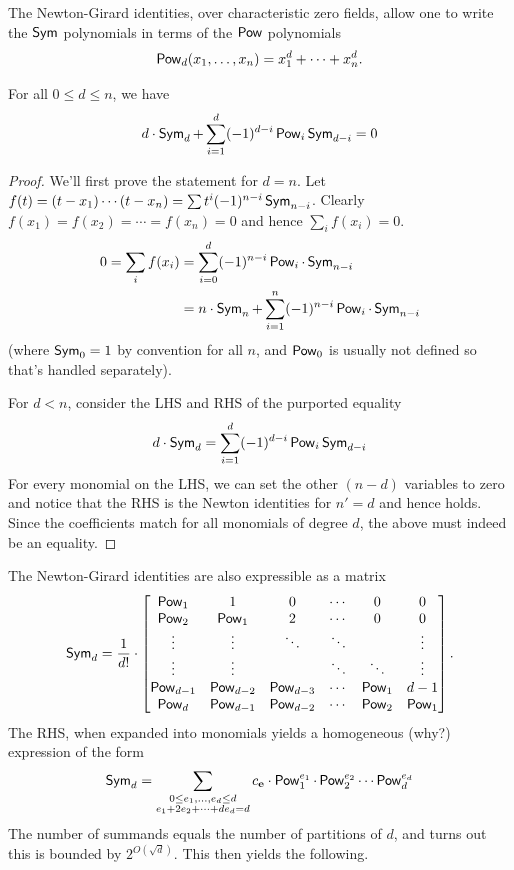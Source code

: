 The Newton-Girard identities, over characteristic zero fields, allow one to write the $\operatorname{\mathsf{Sym}}$ polynomials in terms of the $\operatorname{\mathsf{Pow}}$ polynomials
\[
\operatorname{\mathsf{Pow}}_d(x_1,\ldots, x_n) = x_1^d + \cdots + x_n^d.
\]
\begin{lemma}
For all $0 \leq d \leq n$, we have
\[
d \cdot \operatorname{\mathsf{Sym}}_d + \sum_{i=1}^d (-1)^{d-i}\operatorname{\mathsf{Pow}}_i \operatorname{\mathsf{Sym}}_{d-i} = 0
\]
\end{lemma}
\begin{proof}
  We'll first prove the statement for $d = n$. 
  Let $f(t) = (t - x_1) \cdots (t - x_n) = \sum t^i (-1)^{n-i} \operatorname{\mathsf{Sym}}_{n-i}$. Clearly $f(x_1) = f(x_2) = \cdots = f(x_n) = 0$ and hence $\sum_i f(x_i) = 0$. 
  \begin{align*}
  0 = \sum_i f(x_i) &= \sum_{i=0}^d (-1)^{n-i} \operatorname{\mathsf{Pow}}_i \cdot \operatorname{\mathsf{Sym}}_{n-i}\\
    & = n \cdot \operatorname{\mathsf{Sym}}_n + \sum_{i=1}^n (-1)^{n-i} \operatorname{\mathsf{Pow}}_i \cdot \operatorname{\mathsf{Sym}}_{n-i}
  \end{align*}
  (where $\operatorname{\mathsf{Sym}}_0 = 1$ by convention for all $n$, and $\operatorname{\mathsf{Pow}}_0$ is usually not defined so that's handled separately). 

  For $d < n$, consider the LHS and RHS of the purported equality
  \[
  d \cdot \operatorname{\mathsf{Sym}}_d = \sum_{i=1}^d (-1)^{d-i} \operatorname{\mathsf{Pow}}_i \operatorname{\mathsf{Sym}}_{d-i}
  \]
  For every monomial on the LHS, we can set the other $(n-d)$ variables to zero and notice that the RHS is the Newton identities for $n' = d$ and hence holds. Since the coefficients match for all monomials of degree $d$, the above must indeed be an equality.
\end{proof}

The Newton-Girard identities are also expressible as a matrix
\[
  \operatorname{\mathsf{Sym}}_d = \frac{1}{d!} \cdot 
  \begin{bmatrix}\operatorname{\mathsf{Pow}}_1 & 1 & 0 & \cdots & 0 & 0\\ 
    \operatorname{\mathsf{Pow}}_2 & \operatorname{\mathsf{Pow}}_1 & 2 & \cdots & 0 & 0 \\ 
    \vdots& \vdots & \ddots & \ddots &  & \vdots \\
    \vdots& \vdots &  & \ddots & \ddots & \vdots \\
    \operatorname{\mathsf{Pow}}_{d-1} & \operatorname{\mathsf{Pow}}_{d-2} & \operatorname{\mathsf{Pow}}_{d-3}& \cdots & \operatorname{\mathsf{Pow}}_1 & d-1 \\ 
    \operatorname{\mathsf{Pow}}_d & \operatorname{\mathsf{Pow}}_{d-1} & \operatorname{\mathsf{Pow}}_{d-2} & \cdots & \operatorname{\mathsf{Pow}}_2 & \operatorname{\mathsf{Pow}}_1 
  \end{bmatrix}.
\]
The RHS, when expanded into monomials yields a homogeneous (why?) expression of the form 
\[
\operatorname{\mathsf{Sym}}_d = \sum_{\substack{0\leq e_1,\ldots, e_d\leq d\\ e_1 + 2e_2 + \cdots + de_d = d}} c_{\mathbf{e}} \cdot \operatorname{\mathsf{Pow}}_1^{e_1} \cdot \operatorname{\mathsf{Pow}}_2^{e_2} \cdots \operatorname{\mathsf{Pow}}_d^{e_d}
\]
The number of summands equals the number of partitions of $d$, and turns out this is bounded by $2^{O(\sqrt{d})}$. This then yields the following. 

